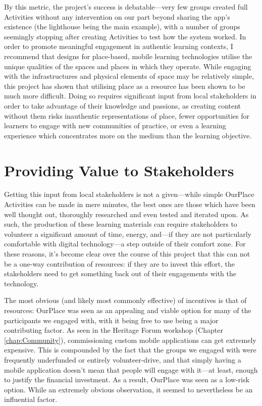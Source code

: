 By this metric, the project's success is debatable---very few groups created full Activities without any intervention on our part beyond sharing the app's existence (the lighthouse being the main example), with a number of groups seemingly stopping after creating Activities to test how the system worked. In order to promote meaningful engagement in authentic learning contexts, I recommend that designs for place-based, mobile learning technologies utilise the unique qualities of the spaces and places in which they operate. While engaging with the infrastructures and physical elements of space may be relatively simple, this project has shown that utilising place as a resource has been shown to be much more difficult. Doing so requires significant input from local stakeholders in order to take advantage of their knowledge and passions, as creating content without them risks inauthentic representations of place, fewer opportunities for learners to engage with new communities of practice, or even a learning experience which concentrates more on the medium than the learning objective. 

\section{Providing Value to Stakeholders}

Getting this input from local stakeholders is not a given---while simple OurPlace Activities can be made in mere minutes, the best ones are those which have been well thought out, thoroughly researched and even tested and iterated upon. As such, the production of these learning materials can require stakeholders to volunteer a significant amount of time, energy, and---if they are not particularly comfortable with digital technology---a step outside of their comfort zone. For these reasons, it's become clear over the course of this project that this can not be a one-way contribution of resources: if they are to invest this effort, the stakeholders need to get something back out of their engagements with the technology.

The most obvious (and likely most commonly effective) of incentives is that of resources: OurPlace was seen as an appealing and viable option for many of the participants we engaged with, with it being free to use being a major contributing factor. As seen in the Heritage Forum workshop (Chapter \ref{chap:Community}), commissioning custom mobile applications can get extremely expensive. This is compounded by the fact that the groups we engaged with were frequently underfunded or entirely volunteer-drive, and that simply having a mobile application doesn't mean that people will engage with it---at least, enough to justify the financial investment. As a result, OurPlace was seen as a low-risk option. While an extremely obvious observation, it seemed to nevertheless be an influential factor.

